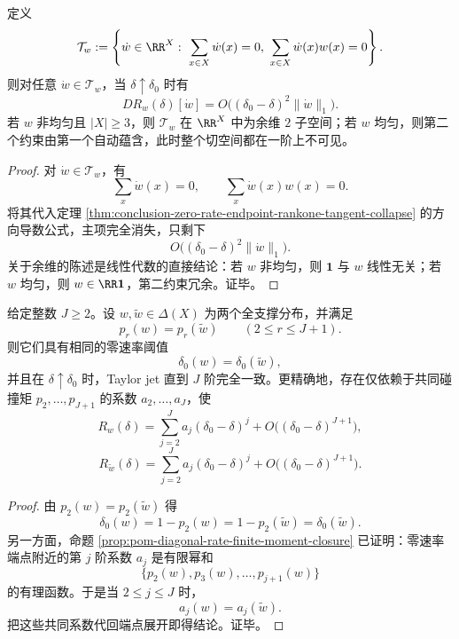 \begin{corollary}\label{cor:conclusion-zero-rate-endpoint-first-order-blind-hyperplane}
定义
\[
\mathcal T_w:=
\left\{
\dot w\in \RR^X:\ \sum_{x\in X}\dot w(x)=0,\ \sum_{x\in X}\dot w(x)w(x)=0
\right\}.
\]
则对任意 \(\dot w\in\mathcal T_w\)，当 \(\delta\uparrow\delta_0\) 时有
\[
DR_w(\delta)[\dot w]
=
O\!\bigl((\delta_0-\delta)^2\|\dot w\|_1\bigr).
\]
若 \(w\) 非均匀且 \(|X|\ge 3\)，则 \(\mathcal T_w\) 在 \(\RR^X\) 中为余维 \(2\) 子空间；若 \(w\) 均匀，则第二个约束由第一个自动蕴含，此时整个切空间都在一阶上不可见。
\end{corollary}
\begin{proof}
对 \(\dot w\in\mathcal T_w\)，有
\[
\sum_x \dot w(x)=0,
\qquad
\sum_x \dot w(x)w(x)=0.
\]
将其代入定理 \ref{thm:conclusion-zero-rate-endpoint-rankone-tangent-collapse} 的方向导数公式，主项完全消失，只剩下
\[
O\!\bigl((\delta_0-\delta)^2\|\dot w\|_1\bigr).
\]
关于余维的陈述是线性代数的直接结论：若 \(w\) 非均匀，则 \(\mathbf 1\) 与 \(w\) 线性无关；若 \(w\) 均匀，则 \(w\in \RR\mathbf 1\)，第二约束冗余。证毕。
\end{proof}

\begin{theorem}\label{thm:conclusion-zero-rate-endpoint-finite-collision-jet-rigidity}
给定整数 \(J\ge 2\)。设 \(w,\widetilde w\in\Delta(X)\) 为两个全支撑分布，并满足
\[
p_r(w)=p_r(\widetilde w)\qquad (2\le r\le J+1).
\]
则它们具有相同的零速率阈值
\[
\delta_0(w)=\delta_0(\widetilde w),
\]
并且在 \(\delta\uparrow\delta_0\) 时，Taylor jet 直到 \(J\) 阶完全一致。更精确地，存在仅依赖于共同碰撞矩 \(p_2,\dots,p_{J+1}\) 的系数 \(a_2,\dots,a_J\)，使
\[
R_w(\delta)
=
\sum_{j=2}^J a_j(\delta_0-\delta)^j
+O\!\bigl((\delta_0-\delta)^{J+1}\bigr),
\]
\[
R_{\widetilde w}(\delta)
=
\sum_{j=2}^J a_j(\delta_0-\delta)^j
+O\!\bigl((\delta_0-\delta)^{J+1}\bigr).
\]
\end{theorem}
\begin{proof}
由 \(p_2(w)=p_2(\widetilde w)\) 得
\[
\delta_0(w)=1-p_2(w)=1-p_2(\widetilde w)=\delta_0(\widetilde w).
\]
另一方面，命题 \ref{prop:pom-diagonal-rate-finite-moment-closure} 已证明：零速率端点附近的第 \(j\) 阶系数 \(a_j\) 是有限幂和
\[
\{p_2(w),p_3(w),\dots,p_{j+1}(w)\}
\]
的有理函数。于是当 \(2\le j\le J\) 时，
\[
a_j(w)=a_j(\widetilde w).
\]
把这些共同系数代回端点展开即得结论。证毕。
\end{proof}

